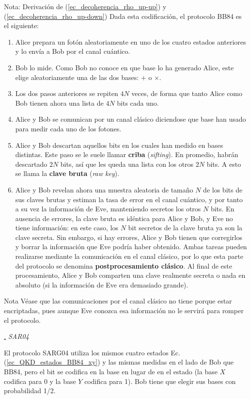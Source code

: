 \documentclass[a4paper,11pt]{book} %
\numberwithin{equation}{chapter}
\def\subsubiContadorIt{\par\addtocounter{subsubsection}{1}\underline{\it\thesubsubsection.}\hskip0.5cm \setcounter{subsubsubsectionIt}{0}}
\newcommand{\SubsubiIt}[1]{
		\subsubiContadorIt \textit{#1}
	}
\newcounter{subsubsubsectionIt}[subsubsection]
\begin{document}
\begin{mybox_blue}{Nota: Derivación de (\ref{ec_decoherencia_rho_up-up}) y  (\ref{ec_decoherencia_rho_up-down})}
Dada esta codificación, el protocolo BB84 es el siguiente:
\begin{enumerate}
	\item Alice prepara un fotón aleatoriamente en uno de los cuatro estados anteriores y lo envía a Bob por el canal cuántico. 
	\item Bob lo mide. Como Bob no conoce en que base lo ha generado Alice, este elige aleatoriamente una de las dos bases: $+$ o $\times$. 
	\item Los dos pasos anteriores se repiten $4N$ veces, de forma que tanto Alice como Bob tienen ahora una lista de $4N$ bits cada uno.
	\item Alice y Bob se comunican por un canal clásico diciendose que base han usado para medir cada uno de los fotones.
	\item Alice y Bob descartan aquellos bits en los cuales han medido en bases distintas. Este paso se le suele llamar \textbf{criba} (\textit{sifting}).  En promedio, habrán descartado $2N$ bits, así que les queda una lista con los otros $2N$ bits. A esto se llama la \textbf{clave bruta} (\textit{raw key}).
	\item  Alice y Bob revelan ahora una muestra aleatoria de tamaño $N$ de los bits de sus claves brutas y estiman la tasa de error en el canal cuántico, y por tanto a su vez la información de Eve, manteniendo secretos los otros $N$ bits. En ausencia de errores, la clave bruta es idéntica para Alice y Bob, y Eve no tiene información: en este caso, los $N$ bit secretos de la clave bruta ya son la clave secreta. Sin embargo, si hay errores, Alice y Bob tienen que corregirlos y borrar la información que Eve podría haber obtenido. Ambas tareas pueden realizarse mediante la comunicación en el canal clásico, por lo que esta parte del protocolo se denomina \textbf{postprocesamiento clásico}. Al final de este procesamiento, Alice y Bob comparten una clave realmente secreta o nada en absoluto (si la información de Eve era demasiado grande).
\end{enumerate}


	\begin{mybox_blue}{Nota}
	Véase que las comunicaciones por el canal clásico no tiene porque estar encriptadas, pues aunque Eve conozca esa información no le servirá para romper el protocolo.
	\end{mybox_blue}


			\SubsubiIt{SAR04}

El protocolo SARG04 \cite{SAR04_1,SAR04_2} utiliza los mismos cuatro estados Ec. (\ref{ec_QKD_estados_BB84_xy}) y las mismas medidas en el lado de Bob que BB84, pero el bit se codifica en la base en lugar de en el estado (la base $X$ codifica para 0 y la base $Y$ codifica para 1). Bob tiene que elegir sus bases con probabilidad 1/2. 


\end{mybox_blue}
\end{document}
